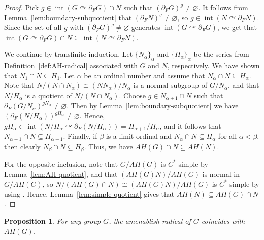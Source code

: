 \documentclass[a4paper]{amsart}
\theoremstyle{plain}
\newtheorem{proposition}[theorem]{Proposition}
\theoremstyle{definition}
\theoremstyle{remark}
\numberwithin{theorem}{section}
\begin{document}
\begin{proof}
Pick $g\in \operatorname{int}(G\curvearrowright\partial_F G)\cap N$ such that $(\partial_F G)^g\neq\varnothing$.
It follows from Lemma~\ref{lem:boundary-subquotient} that $(\partial_F N)^g\neq\varnothing$,
so $g\in\operatorname{int}(N\curvearrowright\partial_F N)$.
Since the set of all $g$ with $(\partial_F G)^g\neq\varnothing$ generates $\operatorname{int}(G\curvearrowright\partial_F G)$,
we get that $\operatorname{int}(G\curvearrowright\partial_F G)\cap N\subseteq\operatorname{int}(N\curvearrowright\partial_F N)$.

We continue by transfinite induction.
Let $\{N_\alpha\}_\alpha$ and $\{H_\alpha\}_\alpha$ be the series from Definition~\ref{def:AH-radical} associated with $G$ and $N$,
respectively.
We have shown that $N_1\cap N\subseteq H_1$.
Let $\alpha$ be an ordinal number and assume that $N_\alpha\cap N\subseteq H_\alpha$.
Note that $N/(N\cap N_\alpha)\cong (NN_\alpha)/N_\alpha$ is a normal subgroup of $G/N_\alpha$,
and that $N/H_\alpha$ is a quotient of $N/(N\cap N_\alpha)$.
Choose $g\in N_{\alpha+1}\cap N$ such that $\partial_F(G/N_\alpha)^{gN_\alpha}\neq\varnothing$.
Then by Lemma~\ref{lem:boundary-subquotient} we have $(\partial_F(N/H_\alpha))^{gH_\alpha}\neq\varnothing$.
Hence, $gH_\alpha\in\operatorname{int}(N/H_\alpha\curvearrowright\partial_F(N/H_\alpha))=H_{\alpha+1}/H_\alpha$,
and it follows that $N_{\alpha+1}\cap N\subseteq H_{\alpha+1}$.
Finally, if $\beta$ is a limit ordinal and $N_\alpha\cap N\subseteq H_\alpha$ for all $\alpha<\beta$,
then clearly $N_\beta\cap N\subseteq H_\beta$.
Thus, we have $AH(G)\cap N\subseteq AH(N)$.

For the opposite inclusion, note that $G/AH(G)$ is $C^*$-simple by Lemma~\ref{lem:AH-quotient}, and that $(AH(G)N)/AH(G)$ is normal in $G/AH(G)$,
so $N/(AH(G)\cap N)\cong (AH(G)N)/AH(G)$ is $C^*$-simple by using \cite[Theorem~1.4]{BKKO}.
Hence, Lemma~\ref{lem:simple-quotient} gives that $AH(N)\subseteq AH(G)\cap N$.
\end{proof}

\begin{proposition}\label{prop:aish-rad}
For any group $G$, the amenablish radical of $G$ coincides with $AH(G)$.
\end{proposition}
\end{document}
